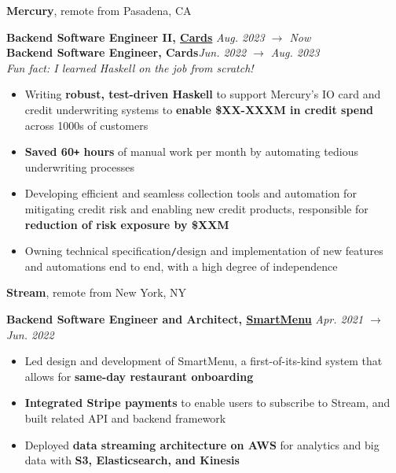 \documentclass[10pt]{article}
\begin{document}
\begin{flushleft}
		\textbf{Mercury}, {\small remote from Pasadena, CA}\\
		\begin{leftli}
			{\small \textbf{Backend Software Engineer II, \href{https://mercury.com/credit}{Cards}} \hfill \textit{\small Aug. 2023 $\rightarrow$ Now}}\\
			{\small \textbf{Backend Software Engineer, Cards}\hfill \textit{\small Jun. 2022 $\rightarrow$ Aug. 2023}}\\
			{\footnotesize \textit{Fun fact: I learned Haskell on the job from scratch!}}
			\begin{itemize}
				\item Writing \textbf{robust, test-driven Haskell} to support Mercury's IO card and credit underwriting systems to \textbf{enable \$XX-XXXM in credit spend} across 1000s of customers
				\vspace{-2mm}
				\item \textbf{Saved 60\texttt{+} hours} of manual work per month by automating tedious underwriting processes
				\vspace{-2mm}
      \item Developing efficient and seamless collection tools and automation for mitigating credit risk and enabling new credit products, responsible for \textbf{reduction of risk exposure by \$XXM}
				\vspace{-2mm}
      \item Owning technical specification\texttt{/}design and implementation of new features and automations end to end, with a high degree of independence
			\end{itemize}
		\end{leftli}

		\vspace{-1.50mm}
		\textbf{Stream}, {\small remote from New York, NY}\\
		\begin{leftli}
			{\small \textbf{Backend Software Engineer and Architect, \href{https://www.streamorders.com/product-features/full-control}{SmartMenu}} \hfill \textit{\small Apr. 2021 $\rightarrow$ Jun. 2022}}\\
			\begin{itemize}
        \item Led design and development of SmartMenu, a first-of-its-kind system that allows for \textbf{same-day restaurant onboarding}
				\vspace{-2mm}
				\item \textbf{Integrated Stripe payments} to enable users to subscribe to Stream, and built related API and backend framework
				\vspace{-2mm}
      \item Deployed \textbf{data streaming architecture on AWS} for analytics and big data with \textbf{S3, Elasticsearch, and Kinesis}
			\end{itemize}
		\end{leftli}


\end{flushleft}
\end{document}
